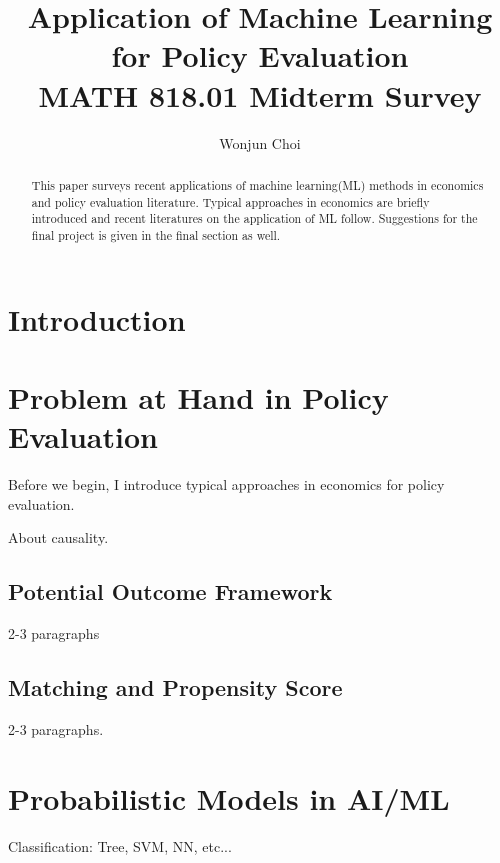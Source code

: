 \documentclass[11pt]{article}
\title{Application of Machine Learning for Policy Evaluation\\
	\large MATH 818.01 Midterm Survey
}
\author{Wonjun Choi}
\date{}
\newtheorem{theorem}{Theorem}
\newcommand{\rr}{\mathbb{R}}
\begin{document}
	
	\maketitle
	
	\begin{abstract}
This paper surveys recent applications of machine learning(ML) methods in economics and policy evaluation literature. Typical approaches in economics are briefly introduced and recent literatures on the application of ML follow. Suggestions for the final project is given in the final section as well.
	\end{abstract}
	
	\section{Introduction}\label{section-introduction}
	
	
	
	\section{Problem at Hand in Policy Evaluation}
	Before we begin, I introduce typical approaches in economics for policy evaluation.
	
	About causality.
	
	\subsection*{Potential Outcome Framework}
	2-3 paragraphs
	
	\subsection*{Matching and Propensity Score}
	2-3 paragraphs.
	
	\section{Probabilistic Models in AI/ML}
Classification: Tree, SVM, NN, etc...
	
\end{document}
